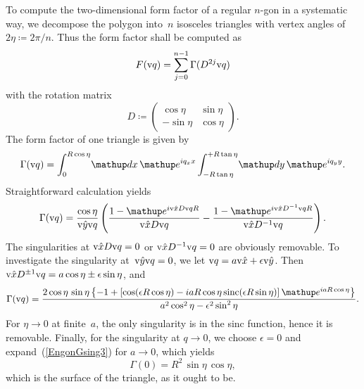 To compute the two-dimensional form factor
of a regular $n$-gon in a systematic way,
we decompose the polygon into~$n$ isosceles triangles
with vertex angles of $2\eta\coloneqq2\pi/n$.
Thus the form factor shall be computed as
\begin{equation}
  F(\text{v}{q}) = \sum_{j=0}^{n-1} \Gamma(D^{2j}\text{v}{q})
\end{equation}
with the rotation matrix
\begin{equation}
  D\coloneqq\left(\begin{array}{ll}\cos\eta&\sin\eta\\
                          -\sin\eta&\cos\eta\end{array}\right).
\end{equation}
The form factor of one triangle is given by
\begin{equation}
  \Gamma(\q)
  =\int_0^{R\cos\eta}\!\d x\,\e^{iq_x x}
   \int_{-R\tan\eta}^{+R\tan\eta}\!\d y\,\e^{iq_yy}.
\end{equation}
Straightforward calculation yields
\begin{equation}\label{EngonG}
  \Gamma(\q)
  = \frac{\cos\eta}{\hy\q}\left(
    \frac{1-\e^{i\hx D\q R}}{\hx D\q}
   -\frac{1-\e^{i\hx D^{-1}\q R}}{\hx D^{-1}\q}\right).
\end{equation}
The singularities at $\text{v}{\hat x} D\text{v}{q}=0$ or $\text{v}{\hat x} D^{-1}\text{v}{q}=0$ are obviously removable.
To investigate the singularity at~$\text{v}{\hat y}\text{v}{q}=0$,
we let $\text{v}{q}=a\text{v}{\hat x}+\epsilon\text{v}{\hat y}$.
Then $\text{v}{\hat x} D^{\pm1}\text{v}{q} = a\cos\eta\pm\epsilon\sin\eta$,
and
\begin{equation}\label{EngonGsing3}
  \Gamma(\q) = \frac{2\cos\eta\,\sin\eta
  \left\{ -1+\left[\cos(\epsilon R\cos\eta)
        -iaR\cos\eta\sinc(\epsilon R\sin\eta)\right]\e^{iaR\cos\eta}\right\}}
{a^2\cos^2\eta-\epsilon^2\sin^2\eta}.
\end{equation}
For $\eta\to0$ at finite~$a$, the only singularity is in the sinc function,
hence it is removable.
Finally, for the singularity at $q\to0$, we choose $\epsilon=0$ and
expand~(\ref{EngonGsing3}) for $a\to0$,
which yields
\begin{equation}
  \Gamma(0) = R^2\,\sin\eta\,\cos\eta,
\end{equation}
which is the surface of the triangle, as it ought to be.

\iffalse
\section{Special functions near the removable singularity}

\index{Machine epsilon}
We assume a double-precision machine epsilon
of $\epsilon=2^{-52}\simeq2.2\cdot10^{-16}$.

\fi

